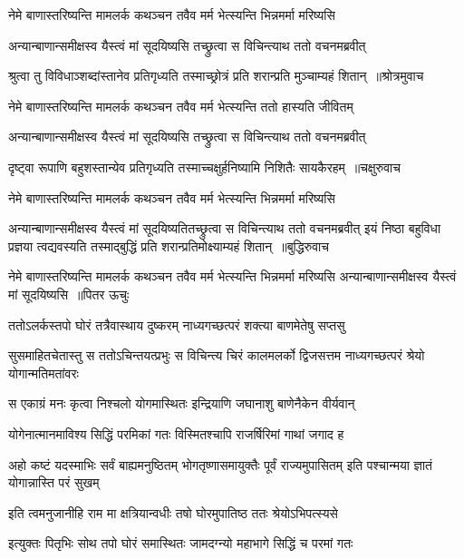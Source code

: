 \twolineshloka
{नेमे बाणास्तरिष्यन्ति मामलर्क कथञ्चन}
{तवैव मर्म भेत्स्यन्ति भिन्नमर्मा मरिष्यसि}


\twolineshloka
{अन्यान्बाणान्समीक्षस्व यैस्त्वं मां सूदयिष्यसि}
{तच्छ्रुत्वा स विचिन्त्याथ ततो वचनमब्रवीत्}


\threelineshloka
{श्रुत्वा तु विविधाञ्शब्दांस्तानेव प्रतिगृध्यति}
{तस्माच्छ्रोत्रं प्रति शरान्प्रति मुञ्चाम्यहं शितान् ॥श्रोत्रमुवाच}
{}


\twolineshloka
{नेमे बाणास्तरिष्यन्ति मामलर्क कथञ्चन}
{तवैव मर्म भेत्स्यन्ति ततो हास्यति जीवितम्}


\twolineshloka
{अन्यान्बाणान्समीक्षस्व यैस्त्वं मां सूदयिष्यसि}
{तच्छ्रुत्वा स विचिन्त्याथ ततो वचनमब्रवीत्}


\threelineshloka
{दृष्ट्वा रूपाणि बहुशस्तान्येव प्रतिगृध्यति}
{तस्माच्चक्षुर्हनिष्यामि निशितैः सायकैरहम् ॥चक्षुरुवाच}
{}


\twolineshloka
{नेमे बाणास्तरिष्यन्ति मामलर्क कथञ्चन}
{तवैव मर्म भेत्स्यन्ति भिन्नमर्मा मरिष्यसि}


अन्यान्बाणान्समीक्षस्व यैस्त्वं मां सूदयिष्यतितच्छ्रुत्वा स विचिन्त्याथ ततो वचनमब्रवीत्
\threelineshloka
{इयं निष्ठा बहुविधा प्रज्ञया त्वद्यवस्यति}
{तस्माद्बुद्धिं प्रति शरान्प्रतिमोक्ष्याम्यहं शितान् ॥बुद्धिरुवाच}
{}


\fourlineindentedshloka
{नेमे बाणास्तरिष्यन्ति मामलर्क कथञ्चन}
{तवैव मर्म भेत्स्यन्ति भिन्नमर्मा मरिष्यसि}
{अन्यान्बाणान्समीक्षस्व यैस्त्वं मां सूदयिष्यसि ॥पितर ऊचुः}
{}


\twolineshloka
{ततोऽलर्कस्तपो घोरं तत्रैवास्थाय दुष्करम्}
{नाध्यगच्छत्परं शक्त्या बाणमेतेषु सप्तसु}


\threelineshloka
{सुसमाहितचेतास्तु स ततोऽचिन्तयत्प्रभुः}
{स विचिन्त्य चिरं कालमलर्को द्विजसत्तम}
{नाध्यगच्छत्परं श्रेयो योगान्मतिमतांवरः}


\twolineshloka
{स एकाग्रं मनः कृत्वा निश्चलो योगमास्थितः}
{इन्द्रियाणि जघानाशु बाणेनैकेन वीर्यवान्}


\twolineshloka
{योगेनात्मानमाविश्य सिद्धिं परमिकां गतः}
{विस्मितश्चापि राजर्षिरिमां गाथां जगाद ह}


\threelineshloka
{अहो कष्टं यदस्माभिः सर्वं बाह्यमनुष्ठितम्}
{भोगतृष्णासमायुक्तैः पूर्वं राज्यमुपासितम्}
{इति पश्चान्मया ज्ञातं योगान्नास्ति परं सुखम्}


\twolineshloka
{इति त्वमनुजानीहि राम मा क्षत्रियान्वधीः}
{तषो घोरमुपातिष्ठ ततः श्रेयोऽभिपत्स्यसे}


\twolineshloka
{इत्युक्तः पितृभिः सोथ तपो घोरं समास्थितः}
{जामदग्न्यो महाभागे सिद्धिं च परमां गतः}



